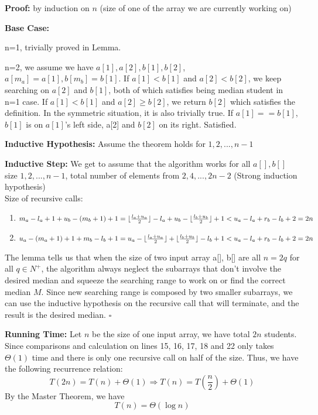 \documentclass{article}
\begin{document}
\textbf{Proof:} by induction on $n$ (size of one of the array we are currently working on)

\textbf{Base Case:} 

n=1, trivially proved in Lemma.

n=2, we assume we have $a[1], a[2], b[1], b[2]$, $a[m_a] = a[1], b[m_b] = b[1]$. If $a[1] < b[1]$ and $a[2] < b[2]$, we keep searching on $a[2]$ and $b[1]$, both of which satisfies being median student in n=1 case. If $ a[1] < b[1]$ and $a[2] \geq b[2]$, we return $b[2]$ which satisfies the definition. In the symmetric situation, it is also trivially true. If $a[1] == b[1]$, $b[1]$ is on $a[1]$'s left side, a[2] and $b[2]$ on its right. Satisfied.

\textbf{Inductive Hypothesis:} Assume the theorem holds for $1,2,...,n-1$

\textbf{Inductive Step:} We get to assume that the algorithm works for all $a[],b[]$ size $1,2,...,n-1$, total number of elements from $2,4,...,2n-2$ (Strong induction hypothesis)
\\Size of recursive calls:
\begin{enumerate}
    \item $m_a-l_a+1+u_b-(m_b+1)+1\\= \lfloor\frac{l_a+u_a}{2}\rfloor-l_a+u_b-\lfloor\frac{l_b+u_b}{2}\rfloor+1 < u_a-l_a+r_b-l_b+2=2n$
    \item $u_a-(m_a+1)+1+m_b-l_b+1\\= u_a-\lfloor\frac{l_a+u_a}{2}\rfloor+\lfloor\frac{l_b+u_b}{2}\rfloor-l_b+1 < u_a-l_a+r_b-l_b+2=2n$
\end{enumerate}

The lemma tells us that when the size of two input array a[], b[] are all $n = 2q$ for all $q\in N^+$, the algorithm always neglect the subarrays that don't involve the desired median and squeeze the searching range to work on or find the correct median $M$. Since new searching range is composed by two smaller subarrays, we can use the inductive hypothesis on the recursive call that will terminate, and the result is the desired median. $\square$

\textbf{Running Time:}
Let $n$ be the size of one input array, we have total $2n$ students. 
Since comparisons and calculation on lines 15, 16, 17, 18 and 22 only takes $\Theta(1)$ time and there is only one recursive call on half of the size. Thus, we have the following recurrence relation: 
\[T(2n) = T(n) + \Theta(1) \Rightarrow T(n) = T(\frac{n}{2})+\Theta(1)\]
By the Master Theorem, we have 
\[T(n)=\Theta(\log{n})\]
\end{document}
